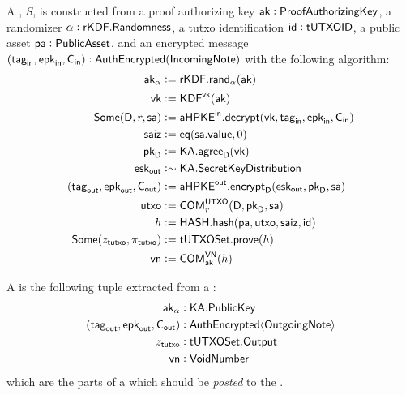 \begin{definition}
    A \Sender{}, $S$, is constructed from a proof authorizing key $\ak : \ProofAuthorizingKey$, a randomizer $\alpha : \rKDF.\Randomness$, a tutxo identification $\ID : \tUTXOID$, a public asset $\pa : \PublicAsset$, and an encrypted message $(\tagin, \epkin, \Cin) : \AuthEncrypted(\IncomingNote)$ with the following algorithm:
    \begin{align*}
        \ak_\alpha                   &:= \rKDF.\rand_\alpha(\ak) \\
        \vk                          &:= \KDF^\vk(\ak) \\
        \Some(\textsf{D}, r, \sa) &:= \aHPKEin.\decrypt(\vk, \tagin, \epkin, \Cin) \\
        \saiz                       &:= \eq(\sa.\VALUE,0) \\
        \pkD                         &:= \KA.\agree_\textsf{D}(\vk) \\
        \eskout                      &:\sim \KA.\SecretKeyDistribution \\
        (\tagout, \epkout, \Cout)    &:= \aHPKEout.\encrypt_\textsf{D}(\eskout, \pkD, \sa) \\
        \utxo                          &:= \COM^{\UTXO}_{r}(\textsf{D}, \pkD, \sa) \\
        h                            &:= \HASH.\hash(\pa, \utxo, \saiz, \ID) \\
        \Some(z_\tutxo, \pi_\tutxo)        &:= \TUTXOSet.\prove(h) \\
        \vn                          &:= \COM^{\VN}_\ak(h)
    \end{align*}
\end{definition}

\begin{definition}
    A \SenderPost{} is the following tuple extracted from a \Sender{}:
    \begin{align*}
        \ak_\alpha                &: \KA.\PublicKey \\
        (\tagout, \epkout, \Cout) &: \AuthEncrypted\bra{\OutgoingNote} \\
        z_\tutxo                     &: \TUTXOSet.\Output \\
        \vn                       &: \VoidNumber
    \end{align*}
    which are the parts of a \Sender{} which should be \emph{posted} to the \Ledger{}.
\end{definition}

